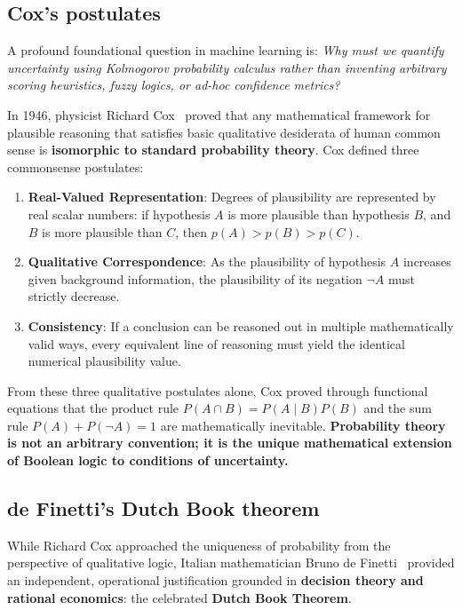 \subsection{Cox's postulates}
\label{sec:cox_postulates}

A profound foundational question in machine learning is: \emph{Why must we quantify uncertainty using Kolmogorov probability calculus rather than inventing arbitrary scoring heuristics, fuzzy logics, or ad-hoc confidence metrics?}

In 1946, physicist Richard Cox~\cite{cox1946probability,jaynes2003probability} proved that any mathematical framework for plausible reasoning that satisfies basic qualitative desiderata of human common sense is \textbf{isomorphic to standard probability theory}. Cox defined three commonsense postulates:
\begin{enumerate}
  \item \textbf{Real-Valued Representation}: Degrees of plausibility are represented by real scalar numbers: if hypothesis $A$ is more plausible than hypothesis $B$, and $B$ is more plausible than $C$, then $p(A) > p(B) > p(C)$.
  \item \textbf{Qualitative Correspondence}: As the plausibility of hypothesis $A$ increases given background information, the plausibility of its negation $\neg A$ must strictly decrease.
  \item \textbf{Consistency}: If a conclusion can be reasoned out in multiple mathematically valid ways, every equivalent line of reasoning must yield the identical numerical plausibility value.
\end{enumerate}
From these three qualitative postulates alone, Cox proved through functional equations that the product rule $P(A \cap B) = P(A \mid B)P(B)$ and the sum rule $P(A) + P(\neg A) = 1$ are mathematically inevitable. \textbf{Probability theory is not an arbitrary convention; it is the unique mathematical extension of Boolean logic to conditions of uncertainty.}

\subsection{de Finetti's Dutch Book theorem}
\label{sec:dutch_book_theorem}

While Richard Cox approached the uniqueness of probability from the perspective of qualitative logic, Italian mathematician Bruno de Finetti~\cite{definetti1937prevision,russell2020artificial} provided an independent, operational justification grounded in \textbf{decision theory and rational economics}: the celebrated \textbf{Dutch Book Theorem}.

